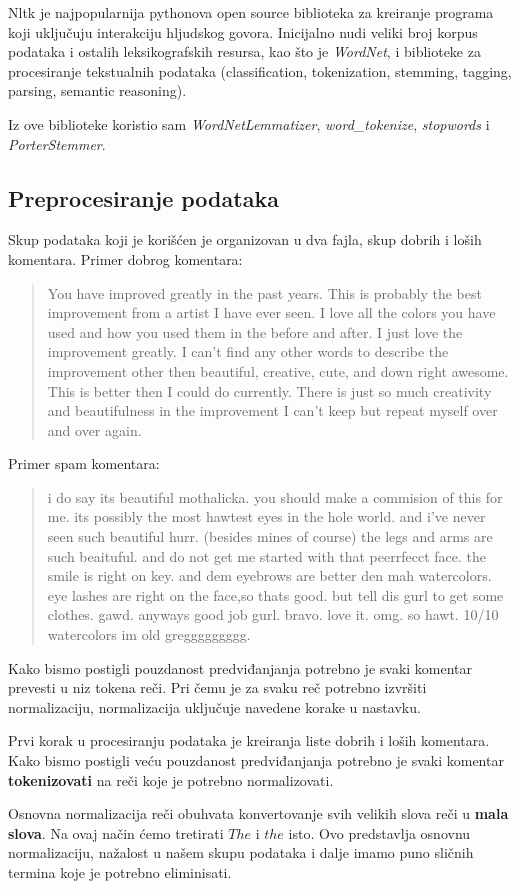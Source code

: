 Nltk je najpopularnija pythonova open source biblioteka za kreiranje programa koji uključuju interakciju hljudskog govora.
Inicijalno nudi veliki broj korpus podataka i ostalih leksikografskih resursa, kao
što je \textit{WordNet}, i biblioteke za procesiranje tekstualnih podataka (classification, tokenization, stemming, tagging, parsing, semantic reasoning).

Iz ove biblioteke koristio sam \textit{WordNetLemmatizer}, \textit{word\_tokenize}, \textit{stopwords} i \textit{PorterStemmer}.

\subsection{Preprocesiranje podataka}
Skup podataka koji je korišćen je organizovan u dva fajla, skup dobrih i loših
komentara.
Primer dobrog komentara:
\blockquote{
You have improved greatly in the past years. This is probably the best
improvement from a artist I have ever seen. I love all the colors you have used
and how you used them in the before and after. I just love the improvement
greatly. I can't find any other words to describe the improvement other then
beautiful, creative, cute, and down right awesome. This is better then I could do
currently. There is just so much creativity and beautifulness in the improvement
I can't keep but repeat myself over and over again.
}
Primer spam komentara:
\blockquote{
i do say its beautiful mothalicka. you should make a commision of this for me.
its possibly the most hawtest eyes in the hole world. and i've never seen such
beautiful hurr. (besides mines of course) the legs and arms are such beaituful.
and do not get me started with that peerrfecct face. the smile is right on key.
 and dem eyebrows are better den mah watercolors. eye lashes are right on the
 face,so thats good. but tell dis gurl to get some clothes. gawd. anyways good
 job gurl. bravo. love it. omg. so hawt. 10/10 watercolors im old greggggggggg.
}

Kako bismo postigli pouzdanost predviđanjanja potrebno je svaki komentar prevesti
u niz tokena reči. Pri čemu je za svaku reč potrebno izvršiti normalizaciju,
normalizacija uključuje navedene korake u nastavku.

Prvi korak u procesiranju podataka je kreiranja liste dobrih i loših komentara.
Kako bismo postigli veću pouzdanost predviđanjanja potrebno je svaki komentar
\textbf{tokenizovati} na reči koje je potrebno normalizovati.

Osnovna normalizacija reči obuhvata konvertovanje svih velikih slova reči u
\textbf{mala slova}. Na ovaj način ćemo tretirati $The$ i $the$ isto. Ovo predstavlja
osnovnu normalizaciju, nažalost u našem skupu podataka i dalje imamo puno sličnih
termina koje je potrebno eliminisati.

